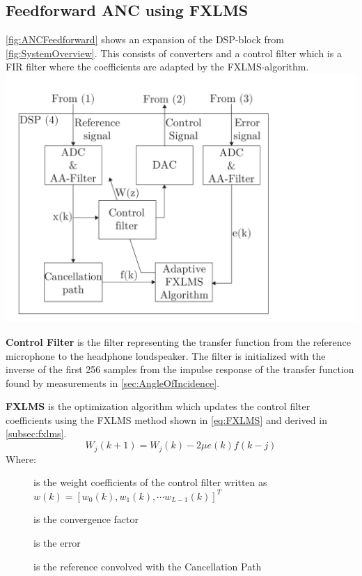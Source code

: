 \subsection*{Feedforward ANC using FXLMS}
\autoref{fig:ANCFeedforward} shows an expansion of the DSP-block from \autoref{fig:SystemOverview}. This consists of converters and a control filter which is a FIR filter where the coefficients are adapted by the FXLMS-algorithm. 
{
	\includegraphics[width=1\columnwidth]{figures/ArticleIllustrations/ANCFeedForward}
	\label{fig:ANCFeedforward}
}



\textbf{Control Filter} is the filter representing the transfer function from the reference microphone to the headphone loudspeaker. The filter is initialized with the inverse of the first 256 samples from the impulse response of the transfer function found by measurements in \autoref{sec:AngleOfIncidence}.  

\textbf{FXLMS} is the optimization algorithm which updates the control filter coefficients using the FXLMS method shown in \autoref{eq:FXLMS} and derived in \autoref{subsec:fxlms}. 
\begin{equation}\label{eq:FXLMS}
W_j(k+1) = W_j(k) - 2\mu e(k)f(k-j) 
\end{equation}
Where:
\vspace{-8mm} %
\begin{description}
	\item[] is the weight coefficients of the control filter written as  $w(k)=[w_0(k),w_1(k), \cdots w_{L-1}(k)]^T$
	\item[\text{$\mu$}] is the convergence factor
	\item[] is the error 
	\item[] is the reference convolved with the Cancellation Path
\end{description}

